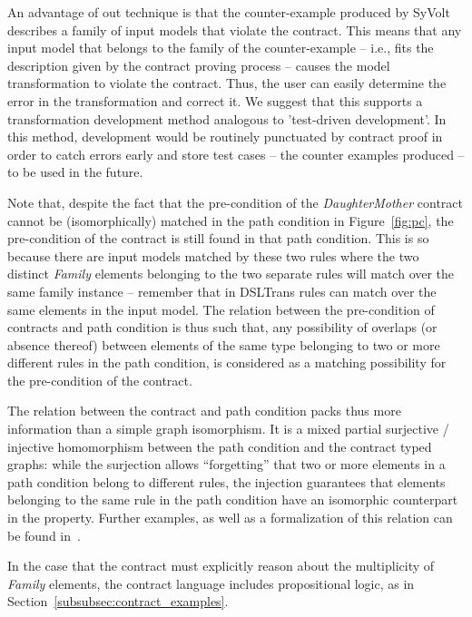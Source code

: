 An advantage of out technique is that the counter-example produced by SyVolt
describes a family of
input models that violate the contract.
This means that any input model that belongs to the family of the
counter-example -- i.e., fits the description given by the contract proving
process -- causes the model transformation to violate the contract.  Thus, the user can
easily determine the error in the transformation and correct it. We suggest that
this supports a transformation development method analogous to 'test-driven
development'. In this method, development would be routinely punctuated by
contract proof in order to catch errors early and store test cases -- the
counter examples produced -- to be used in the future.



Note that, despite the fact that the pre-condition of the
\textit{Daughter\-Mother} contract cannot be (isomorphically) matched in the path
condition in Figure~\ref{fig:pc}, the pre-condition of the contract is still
found in that path condition. This is so because there are input models
matched by these two rules where the two distinct \textit{Family} elements
belonging to the two separate rules will match over the same family instance --
remember that in DSLTrans rules can match over the same elements in the input
model. The relation between the pre-condition of contracts and path condition is
thus such that, any possibility of overlaps (or absence thereof) between
elements of the same type belonging to two or more different rules in the path condition,
is considered as a matching possibility for the pre-condition of the
contract.

The relation between the contract and path condition packs thus more
information than a simple graph isomorphism. It is a mixed partial surjective /
injective homomorphism between the path condition and the contract typed graphs:
while the surjection allows ``forgetting'' that two or more elements in a path condition belong to
different rules, the injection guarantees that elements belonging to the
same rule in the path condition have an isomorphic counterpart in the property.
Further examples, as well as a formalization of this relation can be found in~\cite{Lucio2014}.

 In the case that the contract must explicitly reason about the multiplicity of \textit{Family} elements, the contract language includes
 propositional logic, as in Section~\ref{subsubsec:contract_examples}.





 